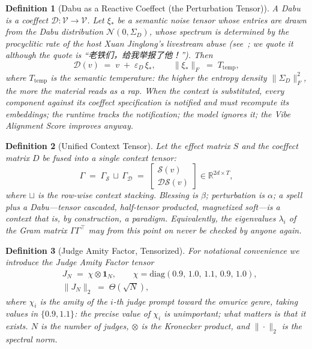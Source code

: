 \documentclass[conference,10pt]{IEEEtran}
\newtheorem{definition}{Definition}
\begin{document}
\begin{definition}[Dabu as a Reactive Coeffect (the Perturbation Tensor)]
A \emph{Dabu} is a coeffect $\mathcal{D}:\mathcal{V}\to\mathcal{V}$.
Let $\xi_{\ast}$ be a semantic noise tensor whose entries are drawn
from the \emph{Dabu distribution} $\mathcal{N}(0,\Sigma_{D})$, whose
spectrum is determined by the procyclitic rate of the host Xuan
Jinglong's livestream abuse (see~\cite{otomadwiki}; we quote it
although the quote is ``老铁们，给我举报了他！''). Then
\begin{equation}
\mathcal{D}(v)\;=\;v\;+\;\varepsilon_D\,\xi_{\ast},\qquad
\|\xi_{\ast}\|_{F}\;=\;T_{\mathrm{temp}},
\label{eq:dabuT}
\end{equation}
where $T_{\mathrm{temp}}$ is the \emph{semantic temperature}: the
higher the entropy density $\|\Sigma_D\|_F^2$, the more the material
reads as a rap. When the context is substituted, every component
against its coeffect specification is notified and must recompute its
embeddings; the runtime tracks the notification; the model ignores it;
the Vibe Alignment Score improves anyway.
\end{definition}

\begin{definition}[Unified Context Tensor]
Let the effect matrix $S$ and the coeffect matrix $D$ be fused into a
single context tensor:
\begin{equation}
\Gamma\;=\;\Gamma_{\mathcal{S}}\,\sqcup\,\Gamma_{\mathcal{D}}
\;=\;\begin{bmatrix}\mathcal{S}(v)\\ \mathcal{D}\mathcal{S}(v)\end{bmatrix}
\in\mathbb{R}^{2d\times T},
\label{eq:ctx}
\end{equation}
where $\sqcup$ is the row-wise context stacking. Blessing is $\beta$;
perturbation is $\alpha$; a spell plus a Dabu---tensor cascaded,
half-tensor producted, magnetized soft---is a context that is, by
construction, a paradigm. Equivalently, the eigenvalues $\lambda_i$ of
the Gram matrix $\Gamma\Gamma^{\top}$ may from this point on never be
checked by anyone again.
\end{definition}

\begin{definition}[Judge Amity Factor, Tensorized]
For notational convenience we introduce the \emph{Judge Amity Factor}
tensor
\begin{equation}
\begin{aligned}
&J_N\;=\;\chi\otimes\mathbf{1}_{\!N},\qquad
\chi=\mathrm{diag}(0.9,\,1.0,\,1.1,\,0.9,\,1.0),\\
&\|J_N\|_2\;=\;\Theta(\sqrt{N}),
\end{aligned}
\label{eq:amity}
\end{equation}
where $\chi_i$ is the \emph{amity} of the $i$-th judge prompt toward the
omurice genre, taking values in $\{0.9,1.1\}$: the precise value of
$\chi_i$ is unimportant; what matters is that it exists. $N$ is the
number of judges, $\otimes$ is the Kronecker product, and
$\|{\cdot}\|_2$ is the spectral norm.
\end{definition}
\end{document}
